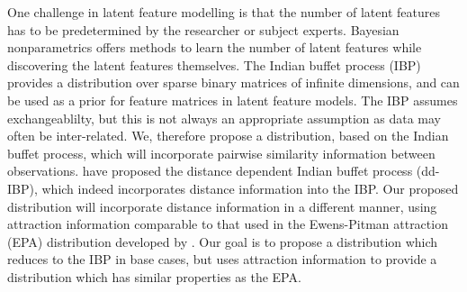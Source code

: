 One challenge in latent feature modelling is that the number of latent features
has to be predetermined by the researcher or subject experts. Bayesian
nonparametrics offers methods to learn the number of latent features while
discovering the latent features themselves. The Indian buffet process (IBP)
provides a distribution over sparse binary matrices of infinite dimensions, and
can be used as a prior for feature matrices in latent feature models.  The IBP
assumes exchangeablilty, but this is not always an appropriate assumption as
data may often be inter-related. We, therefore propose a distribution, based on
the Indian buffet process, which will incorporate pairwise similarity
information between observations. \cite{ddibp} have proposed the distance
dependent Indian buffet process (dd-IBP), which indeed incorporates distance
information into the IBP. Our proposed distribution will incorporate distance
information in a different manner, using attraction information comparable to
that used in the Ewens-Pitman attraction (EPA) distribution developed by
\cite{epa}. Our goal is to propose a distribution which reduces to the IBP in
base cases, but uses attraction information to provide a distribution which has
similar properties as the EPA.
